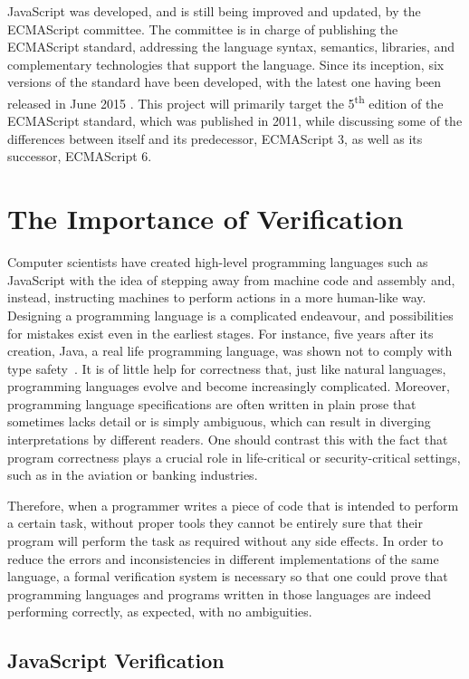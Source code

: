 \documentclass[a4paper,11pt,twoside]{report}
\begin{document}
JavaScript was developed, and is still being improved and updated, by the ECMAScript committee. The committee is in charge of publishing the ECMAScript standard, addressing the language syntax, semantics, libraries, and complementary technologies that support the language. Since its inception, six versions of the standard have been developed, with the latest one having been released in June 2015 \cite{international2015ecmascript}. This project will primarily target the 5\textsuperscript{th} edition of the ECMAScript standard, which was published in 2011, while discussing some of the differences between itself and its predecessor, ECMAScript 3, as well as its successor, ECMAScript 6.

\section{The Importance of Verification}\label{sec:jsspec}
Computer scientists have created high-level programming languages such as JavaScript with the idea of stepping away from machine code and assembly and, instead, instructing machines to perform actions in a more human-like way. Designing a programming language is a complicated endeavour, and possibilities for mistakes exist even in the earliest stages. For instance, five years after its creation, Java, a real life programming language, was shown not to comply with type safety~\cite{drossopoulou1998towards}. It is of little help for correctness that, just like natural languages, programming languages evolve and become increasingly complicated. Moreover, programming language specifications are often written in plain prose that sometimes lacks detail or is simply ambiguous, which can result in diverging interpretations by different readers. One should contrast this with the fact that program correctness plays a crucial role in life-critical or security-critical settings, such as in the aviation or banking industries.

Therefore, when a programmer writes a piece of code that is intended to perform a certain task, without proper tools they cannot be entirely sure that their program will perform the task as required without any side effects. In order to reduce the errors and inconsistencies in different implementations of the same language, a formal verification system is necessary so that one could prove that programming languages and programs written in those languages are indeed performing correctly, as expected, with no ambiguities.

\subsection{JavaScript Verification}
\end{document}
